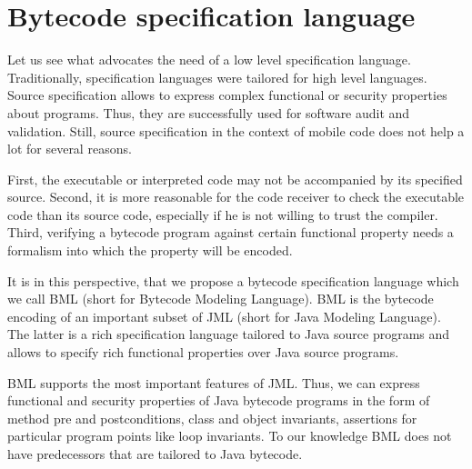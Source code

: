 \section{Bytecode specification language}\label{intro:bml}


Let us see what advocates the need of a low level specification language.
Traditionally, specification languages were tailored for high level languages.  
Source  specification allows to express complex functional or security properties about programs.
Thus, they are successfully  used 
for software audit and validation. Still, source specification in the context of mobile code does not help a lot for several reasons.


First, the executable or interpreted code  may not be accompanied by its specified  source. Second, it is more reasonable for the 
code receiver to check the executable code than its source code, especially if he is not willing to trust the compiler.
Third, verifying a bytecode program against certain functional property needs a formalism into which the property will be encoded. 


 It is in this perspective, that we propose  a bytecode specification language which we call BML (short for Bytecode Modeling Language). 
BML is the bytecode encoding of an important subset of  JML (short for Java Modeling Language). The latter is a rich specification language tailored to Java source programs and
 allows to specify rich functional properties over Java source programs.


 

 BML supports the most important features of JML. Thus, we can express functional and security properties of Java
 bytecode programs in the form of method pre and postconditions, class and object invariants, assertions
 for particular program points like loop invariants. To our knowledge BML does not have predecessors that are tailored 
 to Java bytecode.  






